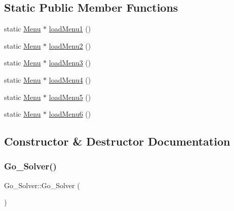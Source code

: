 \subsection*{Static Public Member Functions}
\begin{DoxyCompactItemize}
\item 
static \hyperlink{class_menu}{Menu} $\ast$ \hyperlink{class_go___solver_aefc904642aa7fcc3a5f700f921b9c0ab}{load\+Menu1} ()
\item 
static \hyperlink{class_menu}{Menu} $\ast$ \hyperlink{class_go___solver_acbb6d35d88e5c9bb05ceaae81db6287c}{load\+Menu2} ()
\item 
static \hyperlink{class_menu}{Menu} $\ast$ \hyperlink{class_go___solver_a48def38f87effdb973b5f02329a0af4f}{load\+Menu3} ()
\item 
static \hyperlink{class_menu}{Menu} $\ast$ \hyperlink{class_go___solver_a99b82aef6960441ba24e3b28c7ec9ad5}{load\+Menu4} ()
\item 
static \hyperlink{class_menu}{Menu} $\ast$ \hyperlink{class_go___solver_a480bbc610bbc9bb3b1c675d69128d1fd}{load\+Menu5} ()
\item 
static \hyperlink{class_menu}{Menu} $\ast$ \hyperlink{class_go___solver_a9aa3c644c34232cbc9bd3341930373c9}{load\+Menu6} ()
\end{DoxyCompactItemize}


\subsection{Constructor \& Destructor Documentation}
\mbox{\label{class_go___solver_a30bd2f9d195a5553cc683f8314ea4b58}} 
\subsubsection{\texorpdfstring{Go\+\_\+\+Solver()}{Go\_Solver()}}
{\footnotesize\ttfamily Go\+\_\+\+Solver\+::\+Go\+\_\+\+Solver (\begin{DoxyParamCaption}{ }\end{DoxyParamCaption})}

